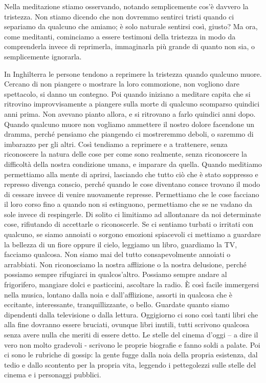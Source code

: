 Nella meditazione stiamo osservando, notando semplicemente cos'è davvero
la tristezza. Non stiamo dicendo che non dovremmo sentirci tristi quando
ci separiamo da qualcuno che amiamo; è solo naturale sentirsi così,
giusto? Ma ora, come meditanti, cominciamo a essere testimoni della
tristezza in modo da comprenderla invece di reprimerla, immaginarla più
grande di quanto non sia, o semplicemente ignorarla.

In Inghilterra le persone tendono a reprimere la tristezza quando
qualcuno muore. Cercano di non piangere o mostrare la loro commozione,
non vogliono dare spettacolo, si danno un contegno. Poi quando iniziano
a meditare capita che si ritrovino improvvisamente a piangere sulla
morte di qualcuno scomparso quindici anni prima. Non avevano pianto
allora, e si ritrovano a farlo quindici anni dopo. Quando qualcuno muore
non vogliamo ammettere il nostro dolore facendone un dramma, perché
pensiamo che piangendo ci mostreremmo deboli, o saremmo di imbarazzo per
gli altri. Così tendiamo a reprimere e a trattenere, senza riconoscere
la natura delle cose per come sono realmente, senza riconoscere la
difficoltà della nostra condizione umana, e imparare da quella. Quando
meditiamo permettiamo alla mente di aprirsi, lasciando che tutto ciò che
è stato soppresso e represso divenga conscio, perché quando le cose
diventano consce trovano il modo di cessare invece di venire nuovamente
represse. Permettiamo che le cose facciano il loro corso fino a quando
non si estinguono, permettiamo che se ne vadano da sole invece di
respingerle. Di solito ci limitiamo ad allontanare da noi determinate
cose, rifiutando di accettarle o riconoscerle. Se ci sentiamo turbati o
irritati con qualcuno, se siamo annoiati o sorgono emozioni spiacevoli
ci mettiamo a guardare la bellezza di un fiore oppure il cielo, leggiamo
un libro, guardiamo la TV, facciamo qualcosa. Non siamo mai del tutto
consapevolmente annoiati o arrabbiati. Non riconosciamo la nostra
afflizione o la nostra delusione, perché possiamo sempre rifugiarci in
qualcos'altro. Possiamo sempre andare al frigorifero, mangiare dolci e
pasticcini, ascoltare la radio. È così facile immergersi nella musica,
lontano dalla noia e dall'afflizione, assorti in qualcosa che è
eccitante, interessante, tranquillizzante, o bello. Guardate quanto
siamo dipendenti dalla televisione o dalla lettura. Oggigiorno ci sono
così tanti libri che alla fine dovranno essere bruciati, ovunque libri
inutili, tutti scrivono qualcosa senza avere nulla che meriti di essere
detto. Le stelle del cinema d'oggi -- a dire il vero non molto gradevoli
- scrivono le proprie biografie e fanno soldi a palate. Poi ci sono le
rubriche di gossip: la gente fugge dalla noia della propria esistenza,
dal tedio e dallo scontento per la propria vita, leggendo i pettegolezzi
sulle stelle del cinema e i personaggi pubblici.

